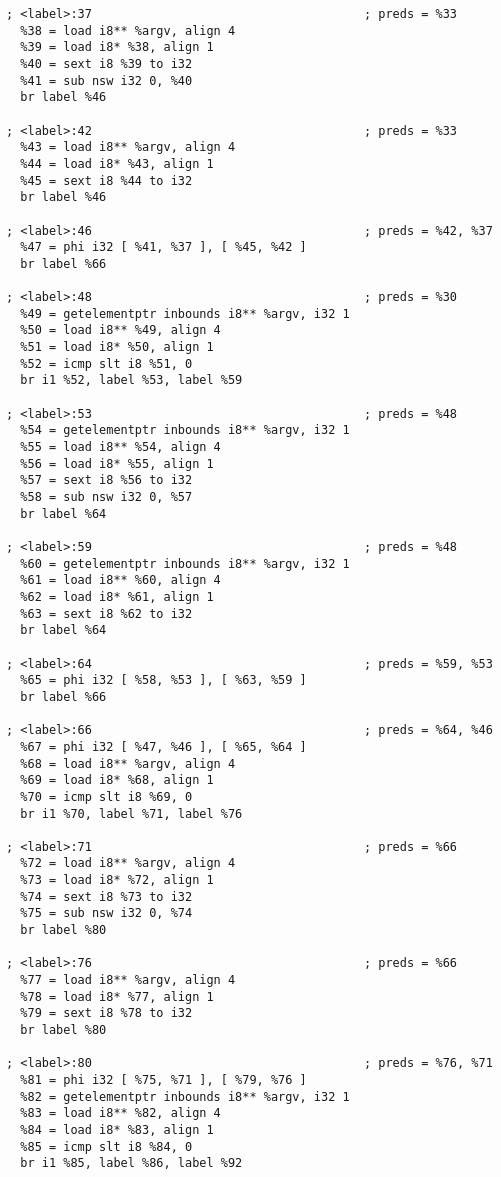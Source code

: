 \begin{lstlisting}
; <label>:37                                      ; preds = %33
  %38 = load i8** %argv, align 4
  %39 = load i8* %38, align 1
  %40 = sext i8 %39 to i32
  %41 = sub nsw i32 0, %40
  br label %46

; <label>:42                                      ; preds = %33
  %43 = load i8** %argv, align 4
  %44 = load i8* %43, align 1
  %45 = sext i8 %44 to i32
  br label %46

; <label>:46                                      ; preds = %42, %37
  %47 = phi i32 [ %41, %37 ], [ %45, %42 ]
  br label %66

; <label>:48                                      ; preds = %30
  %49 = getelementptr inbounds i8** %argv, i32 1
  %50 = load i8** %49, align 4
  %51 = load i8* %50, align 1
  %52 = icmp slt i8 %51, 0
  br i1 %52, label %53, label %59

; <label>:53                                      ; preds = %48
  %54 = getelementptr inbounds i8** %argv, i32 1
  %55 = load i8** %54, align 4
  %56 = load i8* %55, align 1
  %57 = sext i8 %56 to i32
  %58 = sub nsw i32 0, %57
  br label %64

; <label>:59                                      ; preds = %48
  %60 = getelementptr inbounds i8** %argv, i32 1
  %61 = load i8** %60, align 4
  %62 = load i8* %61, align 1
  %63 = sext i8 %62 to i32
  br label %64

; <label>:64                                      ; preds = %59, %53
  %65 = phi i32 [ %58, %53 ], [ %63, %59 ]
  br label %66

; <label>:66                                      ; preds = %64, %46
  %67 = phi i32 [ %47, %46 ], [ %65, %64 ]
  %68 = load i8** %argv, align 4
  %69 = load i8* %68, align 1
  %70 = icmp slt i8 %69, 0
  br i1 %70, label %71, label %76

; <label>:71                                      ; preds = %66
  %72 = load i8** %argv, align 4
  %73 = load i8* %72, align 1
  %74 = sext i8 %73 to i32
  %75 = sub nsw i32 0, %74
  br label %80

; <label>:76                                      ; preds = %66
  %77 = load i8** %argv, align 4
  %78 = load i8* %77, align 1
  %79 = sext i8 %78 to i32
  br label %80

; <label>:80                                      ; preds = %76, %71
  %81 = phi i32 [ %75, %71 ], [ %79, %76 ]
  %82 = getelementptr inbounds i8** %argv, i32 1
  %83 = load i8** %82, align 4
  %84 = load i8* %83, align 1
  %85 = icmp slt i8 %84, 0
  br i1 %85, label %86, label %92


\end{lstlisting}
